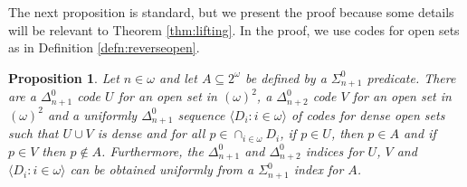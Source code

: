 \documentclass{amsart}
\newtheorem{prop}[thm]{Proposition}
\theoremstyle{definition}
\theoremstyle{remark}
\begin{document}
The next proposition is standard, but we present the proof because some details will be relevant to Theorem \ref{thm:lifting}. In the proof, we use 
codes for open sets as in Definition \ref{defn:reverseopen}. 

\begin{prop}
\label{prop:baire_degrees}
Let $n \in \omega$ and let $A \subseteq 2^{\omega}$ be defined by a $\Sigma^0_{n+1}$ predicate. There are a $\Delta^0_{n+1}$ code $U$ for an open 
set in $(\omega)^2$, a $\Delta^0_{n+2}$ code $V$ for an open set in $(\omega)^2$ and a uniformly $\Delta^0_{n+1}$ sequence $\langle D_i : i \in \omega \rangle$ of codes for 
dense open sets such that $U \cup V$ is dense and for all $p \in \cap_{i \in \omega} D_i$, if $p \in U$, then $p \in A$ and if $p \in V$ then 
$p \not \in A$. Furthermore, the $\Delta^0_{n+1}$ and $\Delta^0_{n+2}$ indices for $U$, $V$ and $\langle D_i : i \in \omega \rangle$ can be obtained uniformly from a 
$\Sigma^0_{n+1}$ index for $A$. 
\end{prop}
\end{document}
